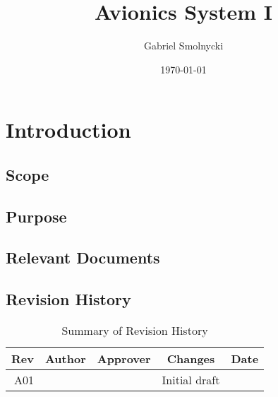 \documentclass[12pt,article]{memoir}
\title{Avionics System I}
\author{Gabriel Smolnycki}
\date{\today}
\begin{document}
	


\tableofcontents*
\clearpage


\chapter{Introduction}
\section{Scope}

\section{Purpose}

\section{Relevant Documents}

\section{Revision History}
\begin{table}[H]
	\centering
	\begin{tabu}{r || c | c | c | c }
		Rev & Author & Approver & Changes & Date\\ \hline
		A01 & & & Initial draft & \\
	\end{tabu}
	\caption{Summary of Revision History}
	\label{tab:rev}
\end{table}


\end{document}
